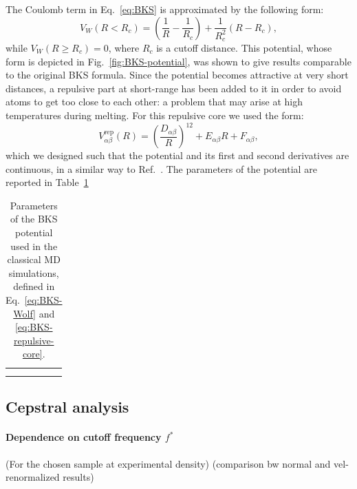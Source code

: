 The Coulomb term in Eq.~\eqref{eq:BKS} is approximated by the following form:
\begin{equation}
    V_W(R<R_c) = \left(\frac{1}{R}-\frac{1}{R_c}\right) + \frac{1}{R_c^2}\left(R-R_c\right),  \label{eq:BKS-Wolf}
\end{equation}
while $V_W(R \geq R_c)=0$, where $R_c$ is a cutoff distance. This potential, whose form is depicted in Fig.~\ref{fig:BKS-potential}, was shown to give results comparable to the original BKS formula. 
Since the potential becomes attractive at very short distances, a repulsive part at short-range has been added to it in order to avoid atoms to get too close to each other: a problem that may arise at high temperatures during melting. For this repulsive core we used the form:
\begin{equation}
    V_{\alpha\beta}^{\mathrm{rep}}(R) = \left(\frac{D_{\alpha\beta}}{R}\right)^{12} + E_{\alpha\beta}R + F_{\alpha\beta}, \label{eq:BKS-repulsive-core}
\end{equation}
which we designed such that the potential and its first and second derivatives are continuous, in a similar way to Ref.~\cite{Mantisi2012}. The parameters of the potential are reported in Table~\ref{tab:BKS-table}

\begin{table}[!htb]
    \centering
    \begin{tabular}{c|c}
         &  \\
         & 
    \end{tabular}
    \caption{Parameters of the BKS potential used in the classical MD simulations, defined in Eq.~\eqref{eq:BKS-Wolf} and \eqref{eq:BKS-repulsive-core}.}
    \label{tab:BKS-table}
\end{table}


\subsection{Cepstral analysis}
\paragraph{Dependence on cutoff frequency $f^*$}
(For the chosen sample at experimental density)
(comparison bw normal and vel-renormalized results)

